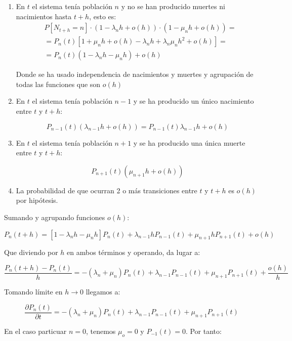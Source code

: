 \documentclass[a4paper,10pt]{scrartcl}
\theoremstyle{definition}
\theoremstyle{definition}
\numberwithin{equation}{section}
\begin{document}
	\begin{enumerate}
		\item En $t$ el sistema tenía población $n$ y no se han producido muertes ni nacimientos hasta $t+h$, esto es:
		\begin{align*}
		&  P[N_{t+h}=n] \cdot (1-\lambda_n h + o(h)) \cdot (1-\mu_n h + o(h))= \\
		&= P_n(t)[1+\mu_n h + o(h) -\lambda_n h + \lambda_n \mu_n h^2 + o(h)] = \\
		&= P_n(t)(1-\lambda_n h - \mu_n h) + o(h)
		\end{align*}
		
		Donde se ha usado independencia de nacimientos y muertes y agrupación de todas las funciones que son $o(h)$
		
		\item En $t$ el sistema tenía población $n-1$ y se ha producido un único nacimiento entre $t$ y $t+h$:
		
		\[P_{n-1}(t) (\lambda_{n-1}h + o(h)) = P_{n-1}(t) \lambda_{n-1} h + o(h)\]
		
		\item En $t$ el sistema tenía población $n+1$ y se ha producido una única muerte entre $t$ y $t+h$:
		
		\[P_{n+1}(t) (\mu_{n+1} h + o(h))\]
		
		\item La probabilidad de que ocurran 2 o más transiciones entre $t$ y $t+h$ es $o(h)$ por hipótesis.
	\end{enumerate}
	
	
	Sumando y agrupando funciones $o(h)$:
	
	\[P_n(t+h) = [1-\lambda_n h -\mu_n h] P_n(t) + \lambda_{n-1} h P_{n-1}(t) + \mu_{n+1} h P_{n+1}(t) + o(h)\]
	
	
	Que diviendo por $h$ en ambos términos y operando, da lugar a:
	
	\[\frac{P_n(t+h) - P_n(t)}{h} = -(\lambda_n + \mu_n) P_n(t) + \lambda_{n-1} P_{n-1}(t) + \mu_{n+1}P_{n+1}(t) + \frac{o(h)}{h}\]
	
	Tomando límite en $h\rightarrow 0$ llegamos a:
	
	\begin{equation}
	\frac{\partial P_n(t)}{\partial t} = -(\lambda_n + \mu_n) P_n(t) + \lambda_{n-1}P_{n-1}(t) + \mu_{n+1}P_{n+1}(t)
	\label{eq:recpn(t)}
	\end{equation}
	
	En el caso particuar $n=0$, tenemos $\mu_o = 0$ y $P_{-1}(t) = 0$. Por tanto:
	
\end{document}
